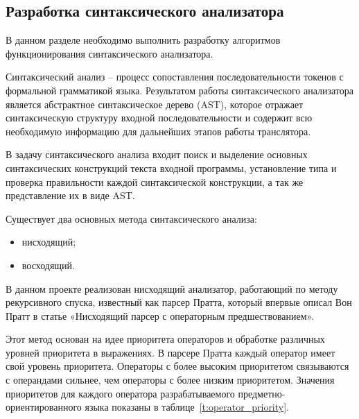 \subsection{Разработка синтаксического анализатора}

В данном разделе необходимо выполнить разработку алгоритмов функционирования синтаксического анализатора.

Синтаксический анализ – процесс сопоставления последовательности токенов с формальной грамматикой языка.
Результатом работы синтаксического анализатора является абстрактное синтаксическое дерево (AST),
которое отражает синтаксическую структуру входной последовательности и содержит всю необходимую информацию для дальнейших этапов работы транслятора.

В задачу синтаксического анализа входит поиск и выделение основных синтаксических конструкций текста входной программы,
установление типа и проверка правильности каждой синтаксической конструкции, а так же представление их в виде AST.

Существует два основных метода синтаксического анализа:

\begin{itemize}
    \item нисходящий;
    \item восходящий.
\end{itemize}

В данном проекте реализован нисходящий анализатор, работающий по методу рекурсивного спуска,
известный как парсер Пратта, который впервые описал Вон Пратт в статье «Нисходящий парсер с операторным предшествованием».

Этот метод основан на идее приоритета операторов и обработке различных уровней приоритета в выражениях.
В парсере Пратта каждый оператор имеет свой уровень приоритета.
Операторы с более высоким приоритетом связываются с операндами сильнее, чем операторы с более низким приоритетом.
Значения приоритетов для каждого оператора разрабатываемого предметно-ориентированного языка показаны в таблице~\ref{t:operator_priority}.

\clearpage

